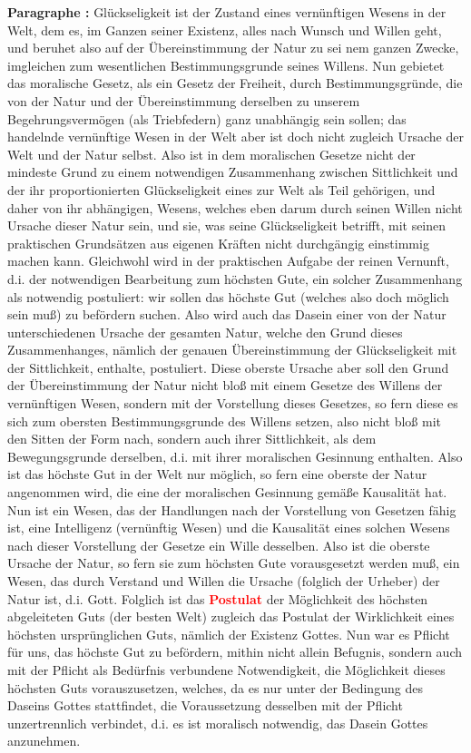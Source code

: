 \documentclass[a4paper,12pt,twoside]{book}
\newcommand{\match}[1]{\textcolor{red}{\textbf{#1}}}
\begin{document}
	\textbf{Paragraphe : }
	Glückseligkeit ist der Zustand eines vernünftigen Wesens in der Welt, dem es, im Ganzen seiner Existenz, alles nach Wunsch und Willen geht, und beruhet also auf der Übereinstimmung der Natur zu sei nem ganzen Zwecke, imgleichen zum wesentlichen Bestimmungsgrunde seines Willens. Nun gebietet das moralische Gesetz, als ein Gesetz der Freiheit, durch Bestimmungsgründe, die von der Natur und der Übereinstimmung derselben zu unserem Begehrungsvermögen (als Triebfedern) ganz unabhängig sein sollen; das handelnde vernünftige Wesen in der Welt aber ist doch nicht zugleich Ursache der Welt und der Natur selbst. Also ist in dem moralischen Gesetze nicht der mindeste Grund zu einem notwendigen Zusammenhang zwischen Sittlichkeit und der ihr proportionierten Glückseligkeit eines zur Welt als Teil gehörigen, und daher von ihr abhängigen, Wesens, welches eben darum durch seinen Willen nicht Ursache dieser Natur sein, und sie, was seine Glückseligkeit betrifft, mit seinen praktischen Grundsätzen aus eigenen Kräften nicht durchgängig einstimmig machen kann. Gleichwohl wird in der praktischen Aufgabe der reinen Vernunft, d.i. der notwendigen Bearbeitung zum höchsten Gute, ein solcher Zusammenhang als notwendig postuliert: wir sollen das höchste Gut (welches also doch möglich sein muß) zu befördern suchen. Also wird auch das Dasein einer von der Natur unterschiedenen Ursache der gesamten Natur, welche den Grund dieses Zusammenhanges, nämlich der genauen Übereinstimmung der Glückseligkeit mit der Sittlichkeit, enthalte, postuliert. Diese oberste Ursache aber soll den Grund der Übereinstimmung der Natur nicht bloß mit einem Gesetze des Willens der vernünftigen Wesen, sondern  mit der Vorstellung dieses Gesetzes, so fern diese es sich zum obersten Bestimmungsgrunde des Willens setzen, also nicht bloß mit den Sitten der Form nach, sondern auch ihrer Sittlichkeit, als dem Bewegungsgrunde derselben, d.i. mit ihrer moralischen Gesinnung enthalten. Also ist das höchste Gut in der Welt nur möglich, so fern eine oberste der Natur angenommen wird, die eine der moralischen Gesinnung gemäße Kausalität hat. Nun ist ein Wesen, das der Handlungen nach der Vorstellung von Gesetzen fähig ist, eine Intelligenz (vernünftig Wesen) und die Kausalität eines solchen Wesens nach dieser Vorstellung der Gesetze ein Wille desselben. Also ist die oberste Ursache der Natur, so fern sie zum höchsten Gute vorausgesetzt werden muß, ein Wesen, das durch Verstand und Willen die Ursache (folglich der Urheber) der Natur ist, d.i. Gott. Folglich ist das \match{Postulat} der Möglichkeit des höchsten abgeleiteten Guts (der besten Welt) zugleich das Postulat der Wirklichkeit eines höchsten ursprünglichen Guts, nämlich der Existenz Gottes. Nun war es Pflicht für uns, das höchste Gut zu befördern, mithin nicht allein Befugnis, sondern auch mit der Pflicht als Bedürfnis verbundene Notwendigkeit, die Möglichkeit dieses höchsten Guts vorauszusetzen, welches, da es nur unter der Bedingung des Daseins Gottes stattfindet, die Voraussetzung desselben mit der Pflicht unzertrennlich verbindet, d.i. es ist moralisch notwendig, das Dasein Gottes anzunehmen. 
	
\end{document}

